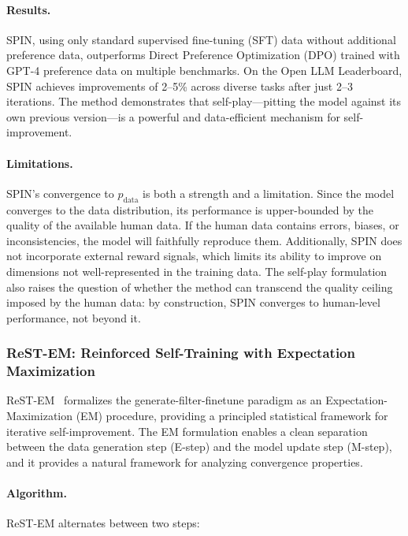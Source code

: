 \paragraph{Results.}
SPIN, using only standard supervised fine-tuning (SFT) data without additional preference data, outperforms Direct Preference Optimization (DPO) trained with GPT-4 preference data on multiple benchmarks. On the Open LLM Leaderboard, SPIN achieves improvements of 2--5\% across diverse tasks after just 2--3 iterations. The method demonstrates that self-play---pitting the model against its own previous version---is a powerful and data-efficient mechanism for self-improvement.

\paragraph{Limitations.}
SPIN's convergence to $p_{\text{data}}$ is both a strength and a limitation. Since the model converges to the data distribution, its performance is upper-bounded by the quality of the available human data. If the human data contains errors, biases, or inconsistencies, the model will faithfully reproduce them. Additionally, SPIN does not incorporate external reward signals, which limits its ability to improve on dimensions not well-represented in the training data. The self-play formulation also raises the question of whether the method can transcend the quality ceiling imposed by the human data: by construction, SPIN converges to human-level performance, not beyond it.


\subsubsection{ReST-EM: Reinforced Self-Training with Expectation Maximization}
\label{sec:rest-em}

ReST-EM~\citep{gulcehre2023rest} formalizes the generate-filter-finetune paradigm as an Expectation-Maximization (EM) procedure, providing a principled statistical framework for iterative self-improvement. The EM formulation enables a clean separation between the data generation step (E-step) and the model update step (M-step), and it provides a natural framework for analyzing convergence properties.

\paragraph{Algorithm.}
ReST-EM alternates between two steps:

